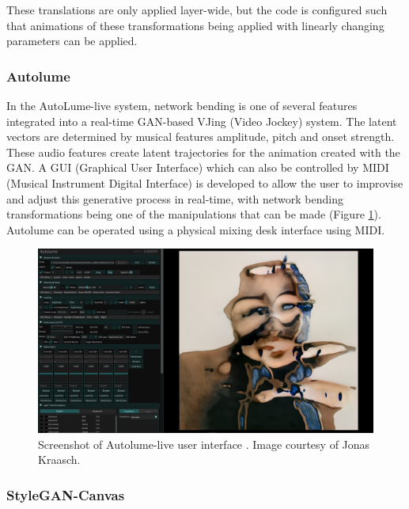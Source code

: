 These translations are only applied layer-wide, but the code is configured such that animations of these transformations being applied with linearly changing parameters can be applied. 

\subsubsection{Autolume}

In the AutoLume-live system, \citep{kraasch2022autolume,kraasch2023autolume} network bending is one of several features integrated into a real-time GAN-based VJing (Video Jockey) system. 
The latent vectors are determined by musical features amplitude, pitch and onset strength. 
These audio features create latent trajectories for the animation created with the GAN. 
A GUI (Graphical User Interface) which can also be controlled by MIDI (Musical Instrument Digital Interface) is developed to allow the user to improvise and adjust this generative process in real-time, with network bending transformations being one of the manipulations that can be made (Figure \ref{fig:c7:autolume-live}). 
Autolume can be operated using a physical mixing desk interface using MIDI.

\begin{figure}[!htb]
    \centering
    \captionsetup{justification=centering}
    \includegraphics[width=1\textwidth]{figures/c7_impact/net-bend-technical/autolume-live.png}
    \caption[Autolume-live user interface]{Screenshot of Autolume-live user interface \citep{kraasch2023autolume}. Image courtesy of Jonas Kraasch.}
    \label{fig:c7:autolume-live}
\end{figure}

\subsubsection{StyleGAN-Canvas}

